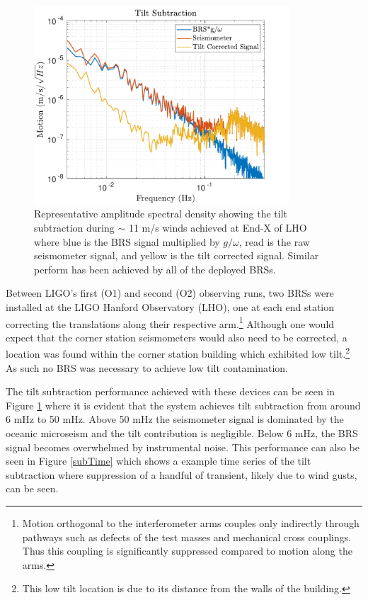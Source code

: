 \documentclass [12pt, proquest]{uwthesis}[2019]
\begin{document}
\begin{figure}[!h]
\begin{center}
\includegraphics[width=0.85\textwidth]{TiltCorrSpec.pdf}
\caption[Representative amplitude spectral density showing the tilt subtraction during windy conditions]{Representative amplitude spectral density showing the tilt subtraction during $\sim$ 11 m/s winds achieved at End-X of LHO where blue is the BRS signal multiplied by $g/\omega$, read is the raw seismometer signal, and yellow is the tilt corrected signal. Similar perform has been achieved by all of the deployed BRSs.}
\label{sub}
\end{center}
\end{figure}

\quad Between LIGO's first (O1) and second (O2) observing runs, two BRSs were installed at the LIGO Hanford Observatory (LHO), one at each end station correcting the translations along their respective arm.\footnote{Motion orthogonal to the interferometer arms couples only indirectly through pathways such as defects of the test masses and mechanical cross couplings. Thus this coupling is significantly suppressed compared to motion along the arms.} Although one would expect that the corner station seismometers would also need to be corrected, a location was found within the corner station building which exhibited low tilt.\footnote{This low tilt location is due to its distance from the walls of the building.} As such no BRS was necessary to achieve low tilt contamination.


The tilt subtraction performance achieved with these devices can be seen in Figure \ref{sub} where it is evident that the system achieves tilt subtraction from around 6 mHz to 50 mHz. Above 50 mHz the seismometer signal is dominated by the oceanic microseism and the tilt contribution is negligible. Below 6 mHz, the BRS signal becomes overwhelmed by instrumental noise. This performance can also be seen in Figure \ref{subTime} which shows a example time series of the tilt subtraction where suppression of a handful of transient, likely due to wind gusts, can be seen.
\end{document}
